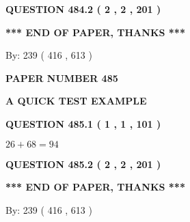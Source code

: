 \documentclass[12pt]{article}
\begin{document}
{\textbf{\Large{QUESTION
484.2 
 ( 2 , 2 , 201 )
}}}
  
  
   
   
 \vspace{0.2in}
 
   
   
   
   
\vspace{1.0in} 
{\textbf{\large{ *** END OF PAPER, THANKS *** }}} 
   
   
\hspace{1.0in} By: 
 239 ( 416 ,  613 )
   
   
   
   
\newpage 
\setcounter{page}{ 
   485001 } 
   
   
   
   
 {\textbf{ \Large{ PAPER NUMBER  485  }}}
   
   
\vspace{0.2in}
   
   
   
   
   
   
 \vspace{0.2in}
{\LARGE {\textbf{ A QUICK TEST EXAMPLE}}}
   
   
  
\vspace{0.2in}
  
{\textbf{\Large{QUESTION
485.1 
 ( 1 , 1 , 101 )
}}}
  
  
 
 

$ %
26 +  %
68=   %
94$
 
 
  
\vspace{0.2in}
  
{\textbf{\Large{QUESTION
485.2 
 ( 2 , 2 , 201 )
}}}
  
  
   
   
 \vspace{0.2in}
 
   
   
   
   
\vspace{1.0in} 
{\textbf{\large{ *** END OF PAPER, THANKS *** }}} 
   
   
\hspace{1.0in} By: 
 239 ( 416 ,  613 )
   
   
   
   
\newpage 
\setcounter{page}{ 
   486001 } 
   
\end{document}
